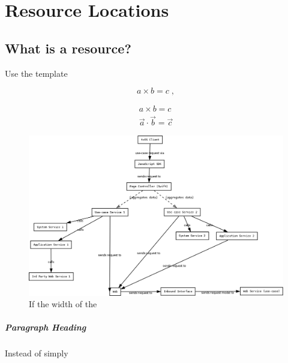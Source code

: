 \chapter{Resource Locations}
\label{1}


\section{What is a resource?}
\label{sec:1}
Use the template

\begin{equation}
a \times b = c\;,
\end{equation}


\begin{eqnarray}
a \times b = c \nonumber\\
\vec{a} \cdot \vec{b}=\vec{c}
\label{eq:01}
\end{eqnarray}


\begin{figure}[b]
\sidecaption
\includegraphics[scale=.20]{figure.png}
\caption{If the width of the}
\label{fig:1}
\end{figure}


\paragraph{Paragraph Heading}
Instead of simply


